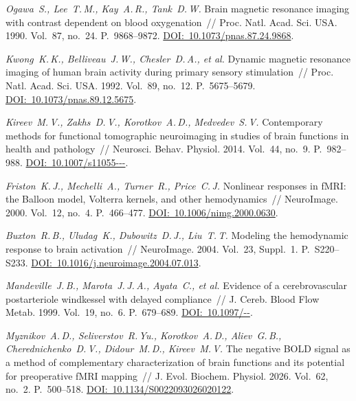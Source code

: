 
\begin{ltrtr}

	\textit{Ogawa~S., Lee~T.\,M., Kay~A.\,R., Tank~D.\,W.} Brain magnetic resonance imaging with contrast dependent on blood oxygenation~// Proc. Natl. Acad. Sci. USA. 1990. Vol.~87, no.~24. P.~9868--9872. \href{https://doi.org/10.1073/pnas.87.24.9868}{DOI:~10.1073/\allowbreak pnas.87.24.9868}.

	\textit{Kwong~K.\,K., Belliveau~J.\,W., Chesler~D.\,A., et al.} Dynamic magnetic resonance imaging of human brain activity during primary sensory stimulation~// Proc. Natl. Acad. Sci. USA. 1992. Vol.~89, no.~12. P.~5675--5679. \href{https://doi.org/10.1073/pnas.89.12.5675}{DOI:~10.1073/\allowbreak pnas.89.12.5675}.

	\textit{Kireev~M.\,V., Zakhs~D.\,V., Korotkov~A.\,D., Medvedev~S.\,V.} Contemporary methods for functional tomographic neuroimaging in studies of brain functions in health and pathology~// Neurosci. Behav. Physiol. 2014. Vol.~44, no.~9. P.~982--988. \href{https://doi.org/10.1007/s11055-014-0013-4}{DOI:~10.1007/\allowbreak s11055---}.

	\textit{Friston~K.\,J., Mechelli~A., Turner~R., Price~C.\,J.} Nonlinear responses in fMRI: the Balloon model, Volterra kernels, and other hemodynamics~// NeuroImage. 2000. Vol.~12, no.~4. P.~466--477. \href{https://doi.org/10.1006/nimg.2000.0630}{DOI:~10.1006/\allowbreak nimg.2000.0630}.

	\textit{Buxton~R.\,B., Uludag~K., Dubowitz~D.\,J., Liu~T.\,T.} Modeling the hemodynamic response to brain activation~// NeuroImage. 2004. Vol.~23, Suppl.~1. P.~S220--S233. \href{https://doi.org/10.1016/j.neuroimage.2004.07.013}{DOI:~10.1016/\allowbreak j.neuroimage.2004.07.013}.

	\textit{Mandeville~J.\,B., Marota~J.\,J.\,A., Ayata~C., et al.} Evidence of a cerebrovascular postarteriole windkessel with delayed compliance~// J. Cereb. Blood Flow Metab. 1999. Vol.~19, no.~6. P.~679--689. \href{https://doi.org/10.1097/00004647-199906000-00012}{DOI:~10.1097/--}.

	\textit{Myznikov~A.\,D., Seliverstov~R.\,Yu., Korotkov~A.\,D., Aliev~G.\,B., Cherednichenko~D.\,V., Didour~M.\,D., Kireev~M.\,V.} The negative BOLD signal as a method of complementary characterization of brain functions and its potential for preoperative fMRI mapping~// J. Evol. Biochem. Physiol. 2026. Vol.~62, no.~2. P.~500--518. \href{https://doi.org/10.1134/S0022093026020122}{DOI:~10.1134/\allowbreak S0022093026020122}.


\end{ltrtr}
